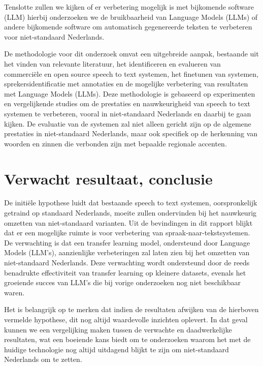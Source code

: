 \par Tenslotte zullen we kijken of er verbetering mogelijk is met bijkomende software (LLM) hierbij onderzoeken we de bruikbaarheid van Language Models (LLMs) of andere bijkomende software om automatisch gegenereerde teksten te verbeteren voor niet-standaard Nederlands.


\par De methodologie voor dit onderzoek omvat een uitgebreide aanpak, bestaande uit het vinden van relevante literatuur, het identificeren en evalueren van commerciële en open source speech to text systemen, het finetunen van systemen, sprekersidentificatie met annotaties en de mogelijke verbetering van resultaten met Language Models (LLMs). Deze methodologie is gebaseerd op experimenten en vergelijkende studies om de prestaties en nauwkeurigheid van speech to text systemen te verbeteren, vooral in niet-standaard Nederlands en daarbij te gaan kijken. De evaluatie van de systemen zal niet alleen gericht zijn op de algemene prestaties in niet-standaard Nederlands, maar ook specifiek op de herkenning van woorden en zinnen die verbonden zijn met bepaalde regionale accenten.

\section{Verwacht resultaat, conclusie}%
\label{sec:verwachte_resultaten}

De initiële hypothese luidt dat bestaande speech to text systemen, oorspronkelijk getraind op standaard Nederlands, moeite zullen ondervinden bij het nauwkeurig omzetten van niet-standaard varianten.
Uit de bevindingen in dit rapport blijkt dat er een mogelijke ruimte is voor verbetering van spraak-naar-tekstsystemen. De verwachting is dat een transfer learning model, ondersteund door Language Models (LLM's), aanzienlijke verbeteringen zal laten zien bij het omzetten van niet-standaard Nederlands. Deze verwachting wordt ondersteund door de reeds benadrukte effectiviteit van transfer learning op kleinere datasets, evenals het groeiende succes van LLM's die bij vorige onderzoeken nog niet beschikbaar waren.

Het is belangrijk op te merken dat indien de resultaten afwijken van de hierboven vermelde hypothese, dit nog altijd waardevolle inzichten oplevert. In dat geval kunnen we een vergelijking maken tussen de verwachte en daadwerkelijke resultaten, wat een boeiende kans biedt om te onderzoeken waarom het met de huidige technologie nog altijd uitdagend blijkt te zijn om niet-standaard Nederlands om te zetten.


